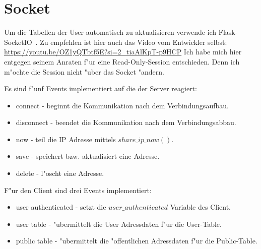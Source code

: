 \section{Socket}\label{sec:socket}
Um die Tabellen der User automatisch zu aktualisieren verwende ich Flask-SocketIO~\cite{socket}.
Zu empfehlen ist hier auch das Video vom Entwickler selbst: \url{https://youtu.be/OZ1yQTbtf5E?si=2_tiaAlKpT-p9HCP}
Ich habe mich hier entgegen seinem Anraten f{"u}r eine Read-Only-Session entschieden.
Denn ich m{"o}chte die Session nicht {"u}ber das Socket {"a}ndern.
\begin{samepage}
    Es sind f{"u}nf Events implementiert auf die der Server reagiert:
    \begin{itemize}
        \setlength\itemsep{-0.4em}
        \item connect - beginnt die Kommunikation nach dem Verbindungsaufbau.
        \item disconnect - beendet die Kommunikation nach dem Verbindungsabbau.
        \item now - teil die IP Adresse mittels $share\_ip\_now()$.
        \item save - speichert bzw. aktualisiert eine Adresse.
        \item delete - l{"o}scht eine Adresse.
    \end{itemize}
\end{samepage}

\begin{samepage}
    F{"u}r den Client sind drei Events implementiert:
    \begin{itemize}
        \setlength\itemsep{-0.4em}
        \item user authenticated - setzt die $user\_authenticated$ Variable des Client.
        \item user table - {"u}bermittelt die User Adressdaten f{"u}r die User-Table.
        \item public table - {"u}bermittelt die {"o}ffentlichen Adressdaten f{"u}r die Public-Table.
    \end{itemize}
\end{samepage}

